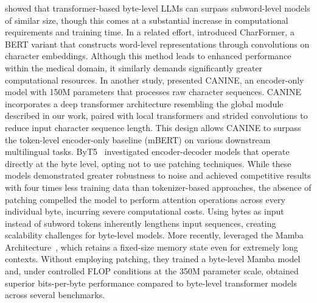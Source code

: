 \cite{Choe2019BridgingTG} showed that transformer-based byte-level LLMs can surpass subword-level models of similar size, though this comes at a substantial increase in computational requirements and training time. In a related effort, \cite{el2020characterbert} introduced CharFormer, a BERT variant that constructs word-level representations through convolutions on character embeddings. Although this method leads to enhanced performance within the medical domain, it similarly demands significantly greater computational resources. In another study, \cite{clark2022canine} presented CANINE, an encoder-only model with 150M parameters that processes raw character sequences. CANINE incorporates a deep transformer architecture resembling the global module described in our work, paired with local transformers and strided convolutions to reduce input character sequence length. This design allows CANINE to surpass the token-level encoder-only baseline (mBERT) on various downstream multilingual tasks. ByT5~\citep{xue2022byt5} investigated encoder-decoder models that operate directly at the byte level, opting not to use patching techniques. While these models demonstrated greater robustness to noise and achieved competitive results with four times less training data than tokenizer-based approaches, the absence of patching compelled the model to perform attention operations across every individual byte, incurring severe computational costs. Using bytes as input instead of subword tokens inherently lengthens input sequences, creating scalability challenges for byte-level models. More recently, \cite{wang2024mambabyte} leveraged the Mamba Architecture~\citep{gu2023mamba}, which retains a fixed-size memory state even for extremely long contexts. Without employing patching, they trained a byte-level Mamba model and, under controlled FLOP conditions at the 350M parameter scale, obtained superior bits-per-byte performance compared to byte-level transformer models across several benchmarks.

